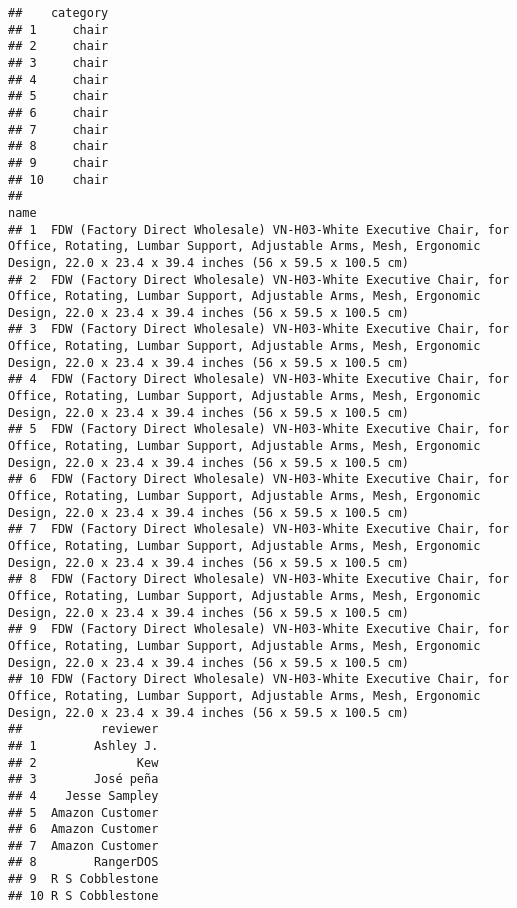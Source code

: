 \documentclass[
]{article}
\begin{document}
\begin{verbatim}
##    category
## 1     chair
## 2     chair
## 3     chair
## 4     chair
## 5     chair
## 6     chair
## 7     chair
## 8     chair
## 9     chair
## 10    chair
##                                                                                                                                                                                            name
## 1  FDW (Factory Direct Wholesale) VN-H03-White Executive Chair, for Office, Rotating, Lumbar Support, Adjustable Arms, Mesh, Ergonomic Design, 22.0 x 23.4 x 39.4 inches (56 x 59.5 x 100.5 cm)
## 2  FDW (Factory Direct Wholesale) VN-H03-White Executive Chair, for Office, Rotating, Lumbar Support, Adjustable Arms, Mesh, Ergonomic Design, 22.0 x 23.4 x 39.4 inches (56 x 59.5 x 100.5 cm)
## 3  FDW (Factory Direct Wholesale) VN-H03-White Executive Chair, for Office, Rotating, Lumbar Support, Adjustable Arms, Mesh, Ergonomic Design, 22.0 x 23.4 x 39.4 inches (56 x 59.5 x 100.5 cm)
## 4  FDW (Factory Direct Wholesale) VN-H03-White Executive Chair, for Office, Rotating, Lumbar Support, Adjustable Arms, Mesh, Ergonomic Design, 22.0 x 23.4 x 39.4 inches (56 x 59.5 x 100.5 cm)
## 5  FDW (Factory Direct Wholesale) VN-H03-White Executive Chair, for Office, Rotating, Lumbar Support, Adjustable Arms, Mesh, Ergonomic Design, 22.0 x 23.4 x 39.4 inches (56 x 59.5 x 100.5 cm)
## 6  FDW (Factory Direct Wholesale) VN-H03-White Executive Chair, for Office, Rotating, Lumbar Support, Adjustable Arms, Mesh, Ergonomic Design, 22.0 x 23.4 x 39.4 inches (56 x 59.5 x 100.5 cm)
## 7  FDW (Factory Direct Wholesale) VN-H03-White Executive Chair, for Office, Rotating, Lumbar Support, Adjustable Arms, Mesh, Ergonomic Design, 22.0 x 23.4 x 39.4 inches (56 x 59.5 x 100.5 cm)
## 8  FDW (Factory Direct Wholesale) VN-H03-White Executive Chair, for Office, Rotating, Lumbar Support, Adjustable Arms, Mesh, Ergonomic Design, 22.0 x 23.4 x 39.4 inches (56 x 59.5 x 100.5 cm)
## 9  FDW (Factory Direct Wholesale) VN-H03-White Executive Chair, for Office, Rotating, Lumbar Support, Adjustable Arms, Mesh, Ergonomic Design, 22.0 x 23.4 x 39.4 inches (56 x 59.5 x 100.5 cm)
## 10 FDW (Factory Direct Wholesale) VN-H03-White Executive Chair, for Office, Rotating, Lumbar Support, Adjustable Arms, Mesh, Ergonomic Design, 22.0 x 23.4 x 39.4 inches (56 x 59.5 x 100.5 cm)
##           reviewer
## 1        Ashley J.
## 2              Kew
## 3        José peña
## 4    Jesse Sampley
## 5  Amazon Customer
## 6  Amazon Customer
## 7  Amazon Customer
## 8        RangerDOS
## 9  R S Cobblestone
## 10 R S Cobblestone

\end{verbatim}
\end{document}
